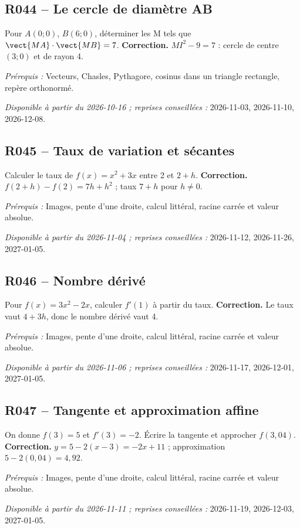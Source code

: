 \subsection*{R044 -- Le cercle de diamètre AB}\label{R044}
Pour $A(0;0)$, $B(6;0)$, déterminer les M tels que $\vect{MA}\cdot\vect{MB}=7$.
\ifprof\textbf{Correction.} $MI^2-9=7$ : cercle de centre $(3;0)$ et de rayon 4.\par\textit{Prérequis :} Vecteurs, Chasles, Pythagore, cosinus dans un triangle rectangle, repère orthonormé.\par\textit{Disponible à partir du 2026-10-16 ; reprises conseillées :} 2026-11-03, 2026-11-10, 2026-12-08.\fi
{}\subsection*{R045 -- Taux de variation et sécantes}\label{R045}
Calculer le taux de $f(x)=x^2+3x$ entre 2 et $2+h$.
\ifprof\textbf{Correction.} $f(2+h)-f(2)=7h+h^2$ ; taux $7+h$ pour $h\ne0$.\par\textit{Prérequis :} Images, pente d’une droite, calcul littéral, racine carrée et valeur absolue.\par\textit{Disponible à partir du 2026-11-04 ; reprises conseillées :} 2026-11-12, 2026-11-26, 2027-01-05.\fi
{}\subsection*{R046 -- Nombre dérivé}\label{R046}
Pour $f(x)=3x^2-2x$, calculer $f\prime(1)$ à partir du taux.
\ifprof\textbf{Correction.} Le taux vaut $4+3h$, donc le nombre dérivé vaut 4.\par\textit{Prérequis :} Images, pente d’une droite, calcul littéral, racine carrée et valeur absolue.\par\textit{Disponible à partir du 2026-11-06 ; reprises conseillées :} 2026-11-17, 2026-12-01, 2027-01-05.\fi
{}\subsection*{R047 -- Tangente et approximation affine}\label{R047}
On donne $f(3)=5$ et $f\prime(3)=-2$. Écrire la tangente et approcher $f(3{,}04)$.
\ifprof\textbf{Correction.} $y=5-2(x-3)=-2x+11$ ; approximation $5-2(0{,}04)=4{,}92$.\par\textit{Prérequis :} Images, pente d’une droite, calcul littéral, racine carrée et valeur absolue.\par\textit{Disponible à partir du 2026-11-11 ; reprises conseillées :} 2026-11-19, 2026-12-03, 2027-01-05.\fi
